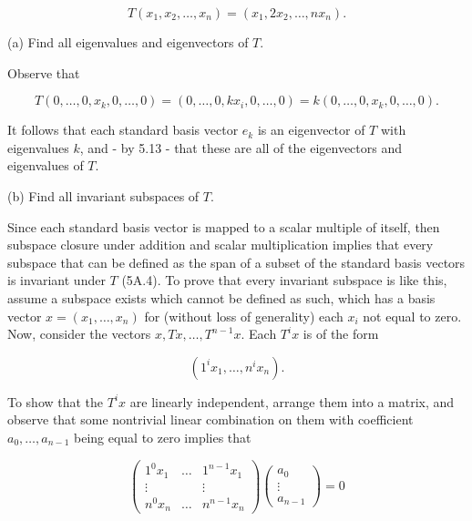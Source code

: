 \documentclass{book}
\begin{document}
\begin{enumerate}
\begin{equation*}
    T(x_1,x_2,\dots,x_n)=(x_1,2x_2,\dots,nx_n).
\end{equation*}

(a) Find all eigenvalues and eigenvectors of \(T\).

Observe that 

\begin{equation*}
    T(0,\dots,0,x_k,0,\dots,0) = (0,\dots,0,kx_i,0,\dots,0) = k(0,\dots,0,x_k,0,\dots,0).
\end{equation*}

It follows that each standard basis vector \(e_k\) is an eigenvector of \(T\) with eigenvalues \(k\), and - by 5.13 - that these are all of the eigenvectors and eigenvalues of \(T\).

(b) Find all invariant subspaces of \(T\).

Since each standard basis vector is mapped to a scalar multiple of itself, then subspace closure under addition and scalar multiplication implies that every subspace that can be defined as the span of a subset of the standard basis vectors is invariant under \(T\) (5A.4).  To prove that every invariant subspace is like this, assume a subspace exists which cannot be defined as such, which has a basis vector \(x=(x_1,\dots,x_n)\) for (without loss of generality) each \(x_i\) not equal to zero.  Now, consider the vectors \(x, Tx, \dots, T^{n-1}x\).  Each \(T^i x\) is of the form

\begin{equation*}
    (1^i x_1,\dots,n^i x_n).
\end{equation*}

To show that the \(T^i x\) are linearly independent, arrange them into a matrix, and observe that some nontrivial linear combination on them with coefficient \(a_0,\dots,a_{n-1}\) being equal to zero implies that

\begin{equation*}
    \begin{pmatrix}
        1^0x_1 & \dots & 1^{n-1}x_1 \\
        \vdots & & \vdots \\
        n^0x_n & \dots & n^{n-1}x_n
    \end{pmatrix}
    \begin{pmatrix}
        a_0 \\
        \vdots \\
        a_{n-1}
    \end{pmatrix}
    =0
\end{equation*}


\end{enumerate}
\end{document}
